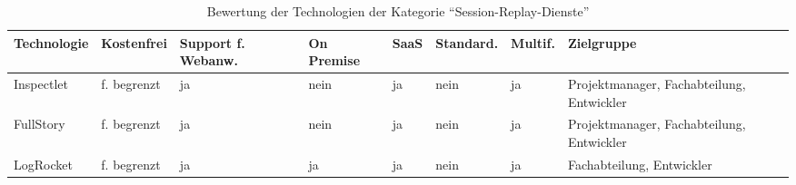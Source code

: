 \begin{table}[H]%
\centering
\addtolength{\leftskip}{-2cm}
\addtolength{\rightskip}{-2cm}
\begin{tabular}{|p{3.05cm}|p{1.8cm}|p{1.7cm}|p{1.2cm}|p{1.3cm}|p{1.7cm}|p{1.3cm}|p{2.6cm}|}
\hline
Technologie & Kostenfrei & Support f. Webanw. & On \mbox{Premise} & SaaS & Standard. & Multif. & Zielgruppe \\
\hline
Inspectlet & f. begrenzt & ja & nein & ja & nein & ja & Projektmanager, Fachabteilung, Entwickler \\
\hline
FullStory & f. begrenzt & ja & nein & ja & nein & ja & Projektmanager, Fachabteilung, Entwickler \\
\hline
LogRocket & f. begrenzt & ja & ja & ja & nein & ja & Fachabteilung, Entwickler \\
\hline
\end{tabular}
\caption{Bewertung der Technologien der Kategorie \enquote{Session-Replay-Dienste}}
\label{tab:technologie-bewertung-session-replay-dienste}
\end{table}
